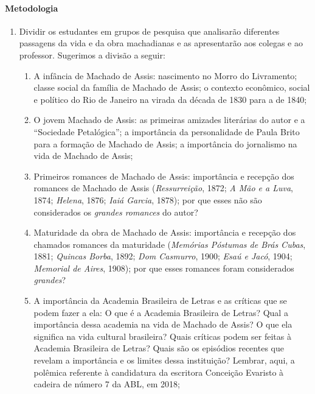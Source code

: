 \documentclass[11pt]{extarticle}
\begin{document}
\paragraph{Metodologia}
\begin{enumerate}
\item
Dividir os estudantes em grupos de pesquisa que analisarão diferentes
passagens da vida e da obra machadianas e as apresentarão aos colegas e
ao professor. Sugerimos a divisão a seguir:

\begin{enumerate}
\item A infância de Machado de Assis: nascimento no Morro do Livramento;
classe social da família de Machado de Assis; o contexto econômico,
social e político do Rio de Janeiro na virada da década de 1830 para a
de 1840;


\item O jovem Machado de Assis: as primeiras amizades literárias do autor e
a ``Sociedade Petalógica''; a importância da personalidade de Paula
Brito para a formação de Machado de Assis; a importância do jornalismo
na vida de Machado de Assis;


\item Primeiros romances de Machado de Assis: importância e recepção dos
romances de Machado de Assis (\emph{Ressurreição}, 1872; \emph{A Mão e a
Luva}, 1874; \emph{Helena}, 1876; \emph{Iaiá Garcia}, 1878); por que
esses não são considerados os \emph{grandes romances} do autor?

\item Maturidade da obra de Machado de Assis: importância e recepção dos
chamados romances da maturidade (\emph{Memórias Póstumas de Brás Cubas},
1881; \emph{Quincas Borba}, 1892; \emph{Dom Casmurro}, 1900; \emph{Esaú
e Jacó}, 1904; \emph{Memorial de Aires}, 1908); por que esses romances
foram considerados \emph{grandes}?

\item A importância da Academia Brasileira de Letras e as críticas que se
podem fazer a ela: O que é a Academia Brasileira de Letras? Qual a
importância dessa academia na vida de Machado de Assis? O que ela
significa na vida cultural brasileira? Quais críticas podem ser feitas à
Academia Brasileira de Letras? Quais são os episódios recentes que
revelam a importância e os limites dessa instituição? Lembrar, aqui, a
polêmica referente à candidatura da escritora Conceição Evaristo à
cadeira de número 7 da ABL, em 2018;


\end{enumerate}
\end{enumerate}
\end{document}
